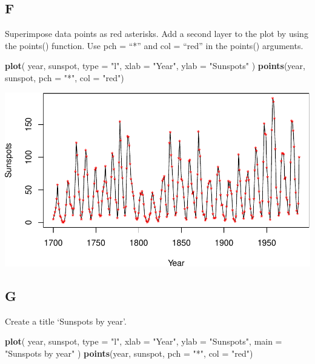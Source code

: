 \documentclass[
]{article}
\newenvironment{Shaded}{\begin{snugshade}}{\end{snugshade}}
\newcommand{\AttributeTok}[1]{\textcolor[rgb]{0.13,0.29,0.53}{#1}}
\newcommand{\FunctionTok}[1]{\textcolor[rgb]{0.13,0.29,0.53}{\textbf{#1}}}
\newcommand{\NormalTok}[1]{#1}
\newcommand{\StringTok}[1]{\textcolor[rgb]{0.31,0.60,0.02}{#1}}
\begin{document}
\hypertarget{f}{%
\subsection{F}\label{f}}

Superimpose data points as red asterisks. Add a second layer to the plot
by using the points() function. Use pch = ``*'' and col = ``red'' in the
points() arguments.

\begin{Shaded}
\begin{Highlighting}[]
\FunctionTok{plot}\NormalTok{(}
\NormalTok{  year,}
\NormalTok{  sunspot,}
  \AttributeTok{type =} \StringTok{"l"}\NormalTok{,}
  \AttributeTok{xlab =} \StringTok{"Year"}\NormalTok{,}
  \AttributeTok{ylab =} \StringTok{"Sunspots"}
\NormalTok{)}
\FunctionTok{points}\NormalTok{(year, sunspot, }\AttributeTok{pch =} \StringTok{"*"}\NormalTok{, }\AttributeTok{col =} \StringTok{"red"}\NormalTok{)}
\end{Highlighting}
\end{Shaded}

\includegraphics{es3_files/figure-latex/unnamed-chunk-6-1.pdf}

\hypertarget{g}{%
\subsection{G}\label{g}}

Create a title `Sunspots by year'.

\begin{Shaded}
\begin{Highlighting}[]
\FunctionTok{plot}\NormalTok{(}
\NormalTok{  year,}
\NormalTok{  sunspot,}
  \AttributeTok{type =} \StringTok{"l"}\NormalTok{,}
  \AttributeTok{xlab =} \StringTok{"Year"}\NormalTok{,}
  \AttributeTok{ylab =} \StringTok{"Sunspots"}\NormalTok{,}
  \AttributeTok{main =} \StringTok{"Sunspots by year"}
\NormalTok{)}
\FunctionTok{points}\NormalTok{(year, sunspot, }\AttributeTok{pch =} \StringTok{"*"}\NormalTok{, }\AttributeTok{col =} \StringTok{"red"}\NormalTok{)}
\end{Highlighting}
\end{Shaded}
\end{document}
